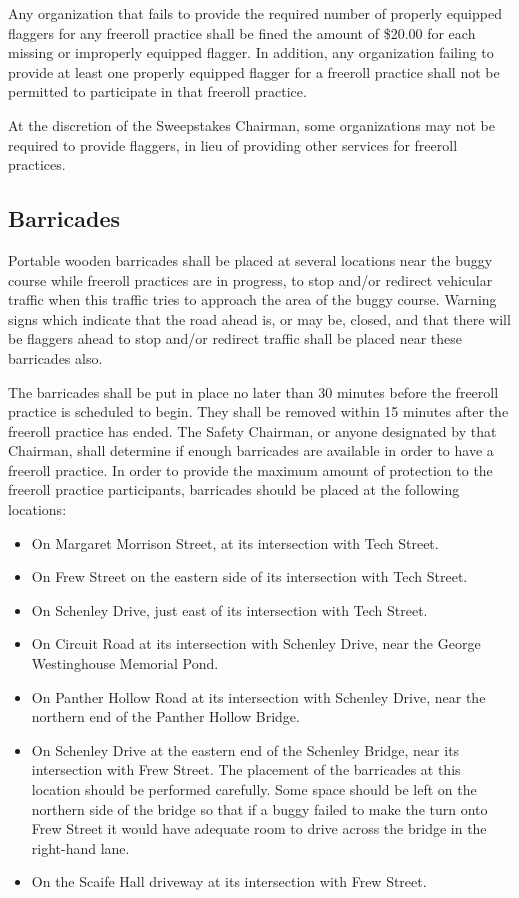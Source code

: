 Any organization that fails to provide the required number of properly equipped flaggers for any freeroll practice shall be fined the amount of \$20.00 for each missing or improperly equipped flagger. In addition, any organization failing to provide at least one properly equipped flagger for a freeroll practice shall not be permitted to participate in that freeroll practice.

At the discretion of the Sweepstakes Chairman, some organizations may not be required to provide flaggers, in lieu of providing other services for freeroll practices.

\subsection{Barricades}

Portable wooden barricades shall be placed at several locations near the buggy course while freeroll practices are in progress, to stop and/or redirect vehicular traffic when this traffic tries to approach the area of the buggy course. Warning signs which indicate that the road ahead is, or may be, closed, and that there will be flaggers ahead to stop and/or redirect traffic shall be placed near these barricades also.

The barricades shall be put in place no later than 30 minutes before the freeroll practice is scheduled to begin. They shall be removed within 15 minutes after the freeroll practice has ended. The Safety Chairman, or anyone designated by that Chairman, shall determine if enough barricades are available in order to have a freeroll practice. In order to provide the maximum amount of protection to the freeroll practice participants, barricades should be placed at the following locations:
\begin{itemize}
	\item On Margaret Morrison Street, at its intersection with Tech Street.
	\item On Frew Street on the eastern side of its intersection with Tech Street.
	\item On Schenley Drive, just east of its intersection with Tech Street.
	\item On Circuit Road at its intersection with Schenley Drive, near the George Westinghouse Memorial Pond.
	\item On Panther Hollow Road at its intersection with Schenley Drive, near the northern end of the Panther Hollow Bridge.
	\item On Schenley Drive at the eastern end of the Schenley Bridge, near its intersection with Frew Street. The placement of the barricades at this location should be performed carefully. Some space should be left on the northern side of the bridge so that if a buggy failed to make the turn onto Frew Street it would have adequate room to drive across the bridge in the right-hand lane.
	\item On the Scaife Hall driveway at its intersection with Frew Street.
\end{itemize}

